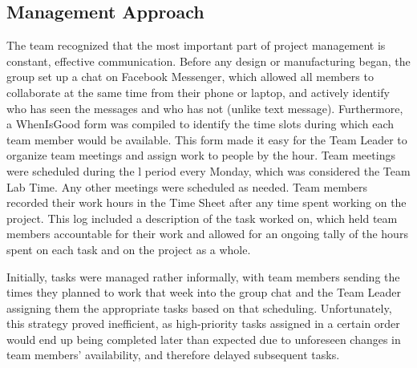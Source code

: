 \subsection{Management Approach}

The team recognized that the most important part of project management is constant, effective communication. Before any design or manufacturing began, the group set up a chat on Facebook Messenger, which allowed all members to collaborate at the same time from their phone or laptop, and actively identify who has seen the messages and who has not (unlike text message). Furthermore, a WhenIsGood form was compiled to identify the time slots during which each team member would be available. This form made it easy for the Team Leader to organize team meetings and assign work to people by the hour. Team meetings were scheduled during the l period every Monday, which was considered the Team Lab Time. Any other meetings were scheduled as needed. Team members recorded their work hours in the Time Sheet after any time spent working on the project. This log included a description of the task worked on, which held team members accountable for their work and allowed for an ongoing tally of the hours spent on each task and on the project as a whole.

Initially, tasks were managed rather informally, with team members sending the times they planned to work that week into the group chat and the Team Leader assigning them the appropriate tasks based on that scheduling. Unfortunately, this strategy proved inefficient, as high-priority tasks assigned in a certain order would end up being completed later than expected due to unforeseen changes in team members' availability, and therefore delayed subsequent tasks.

